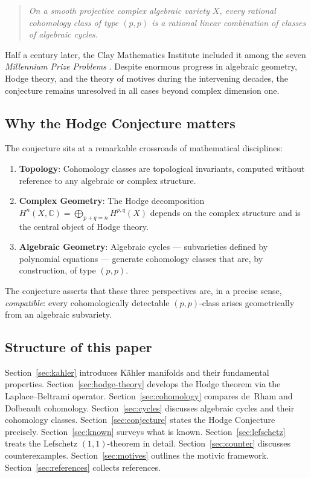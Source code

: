 \documentclass[12pt,a4paper]{amsart}
\theoremstyle{definition}
\theoremstyle{remark}
\begin{document}
\begin{quotation}
\itshape
On a smooth projective complex algebraic variety $X$, every rational cohomology class
of type $(p,p)$ is a rational linear combination of classes of algebraic cycles.
\end{quotation}

Half a century later, the Clay Mathematics Institute included it among the seven
\emph{Millennium Prize Problems} \cite{clay2000}. Despite enormous progress in
algebraic geometry, Hodge theory, and the theory of motives during the intervening
decades, the conjecture remains unresolved in all cases beyond complex dimension one.

\subsection*{Why the Hodge Conjecture matters}

The conjecture sits at a remarkable crossroads of mathematical disciplines:

\begin{enumerate}[label=(\roman*)]
\item \textbf{Topology}: Cohomology classes are topological invariants, computed
  without reference to any algebraic or complex structure.
\item \textbf{Complex Geometry}: The Hodge decomposition $H^n(X,\mathbb{C}) =
  \bigoplus_{p+q=n} H^{p,q}(X)$ depends on the complex structure and is the
  central object of Hodge theory.
\item \textbf{Algebraic Geometry}: Algebraic cycles — subvarieties defined by
  polynomial equations — generate cohomology classes that are, by construction,
  of type $(p,p)$.
\end{enumerate}

The conjecture asserts that these three perspectives are, in a precise sense,
\emph{compatible}: every cohomologically detectable $(p,p)$-class arises
geometrically from an algebraic subvariety.

\subsection*{Structure of this paper}

Section~\ref{sec:kahler} introduces Kähler manifolds and their fundamental
properties. Section~\ref{sec:hodge-theory} develops the Hodge theorem via the
Laplace–Beltrami operator. Section~\ref{sec:cohomology} compares de~Rham and
Dolbeault cohomology. Section~\ref{sec:cycles} discusses algebraic cycles and
their cohomology classes. Section~\ref{sec:conjecture} states the Hodge
Conjecture precisely. Section~\ref{sec:known} surveys what is known.
Section~\ref{sec:lefschetz} treats the Lefschetz $(1,1)$-theorem in detail.
Section~\ref{sec:counter} discusses counterexamples. Section~\ref{sec:motives}
outlines the motivic framework. Section~\ref{sec:references} collects references.
\end{document}
